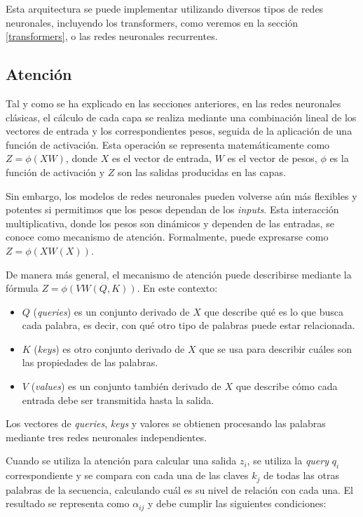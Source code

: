 \documentclass[11pt,spanish,listoffigures,listoftables]{tfgetsinf}
\begin{document}
Esta arquitectura se puede implementar utilizando diversos tipos de redes neuronales, incluyendo los transformers, como veremos en la sección \ref{transformers}, o las redes neuronales recurrentes.

\subsection{Atención}

Tal y como se ha explicado en las secciones anteriores, en las redes neuronales clásicas, el cálculo de cada capa se realiza mediante una combinación lineal de los vectores de entrada y los correspondientes pesos, seguida de la aplicación de una función de activación. Esta operación se representa matemáticamente como $Z = \phi(XW)$, donde $X$ es el vector de entrada, $W$ es el vector de pesos, $\phi$ es la función de activación y $Z$ son las salidas producidas en las capas. \cite{murphy2022probabilistic}

Sin embargo, los modelos de redes neuronales pueden volverse aún más flexibles y potentes si permitimos que los pesos dependan de los \textit{inputs}. Esta interacción multiplicativa, donde los pesos son dinámicos y dependen de las entradas, se conoce como mecanismo de atención. Formalmente, puede expresarse como $Z = \phi(XW(X))$.

De manera más general, el mecanismo de atención puede describirse mediante la fórmula $Z = \phi(VW(Q, K))$. En este contexto:

\begin{itemize}
\item $Q$ (\textit{queries}) es un conjunto derivado de $X$ que describe qué es lo que busca cada palabra, es decir, con qué otro tipo de palabras puede estar relacionada.
\item $K$ (\textit{keys}) es otro conjunto derivado de $X$ que se usa para describir cuáles son las propiedades de las palabras.
\item $V$ (\textit{values}) es un conjunto también derivado de $X$ que describe cómo cada entrada debe ser transmitida hasta la salida.
\end{itemize}

Los vectores de \textit{queries}, \textit{keys} y valores se obtienen procesando las palabras mediante tres redes neuronales independientes.

Cuando se utiliza la atención para calcular una salida $z_i$, se utiliza la \textit{query} $q_i$ correspondiente  y se compara con cada una de las claves $k_j$ de todas las otras palabras de la secuencia, calculando cuál es su nivel de relación con cada una. El resultado se representa como $\alpha_{ij}$ y debe cumplir las siguientes condiciones:
\end{document}
